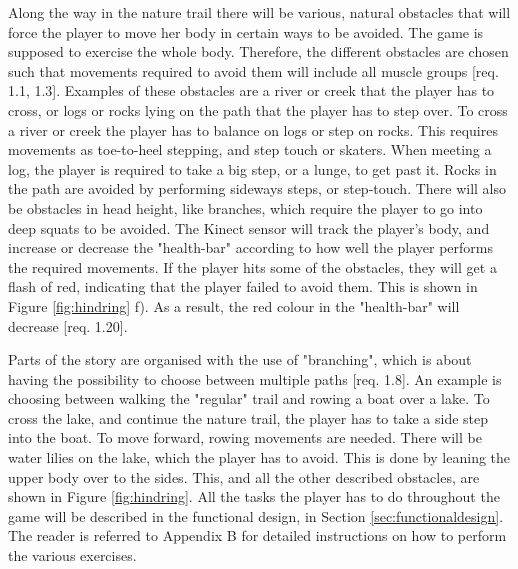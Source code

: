 Along the way in the nature trail there will be various, natural obstacles that will force the player to move her body in certain ways to be avoided. The game is supposed to exercise the whole body. Therefore, the different obstacles are chosen such that movements required to avoid them will include all muscle groups [req. 1.1, 1.3]. Examples of these obstacles are a river or creek that the player has to cross, or logs or rocks lying on the path that the player has to step over. To cross a river or creek the player has to balance on logs or step on rocks. This requires movements as toe-to-heel stepping, and step touch or skaters. When meeting a log, the player is required to take a big step, or a lunge, to get past it. Rocks in the path are avoided by performing sideways steps, or step-touch. There will also be obstacles in head height, like branches, which require the player to go into deep squats to be avoided. The Kinect sensor will track the player's body, and increase or decrease the "health-bar" according to how well the player performs the required movements. If the player hits some of the obstacles, they will get a flash of red, indicating that the player failed to avoid them. This is shown in Figure \ref{fig:hindring} f). As a result, the red colour in the "health-bar" will decrease [req. 1.20].

Parts of the story are organised with the use of "branching", which is about having the possibility to choose between multiple paths [req. 1.8]. An example is choosing between walking the "regular" trail and rowing a boat over a lake. To cross the lake, and continue the nature trail, the player has to take a side step into the boat. To move forward, rowing movements are needed. There will be water lilies on the lake, which the player has to avoid. This is done by leaning the upper body over to the sides. This, and all the other described obstacles, are shown in Figure \ref{fig:hindring}. All the tasks the player has to do throughout the game will be described in the functional design, in Section \ref{sec:functionaldesign}. The reader is referred to Appendix B for detailed instructions on how to perform the various exercises.

